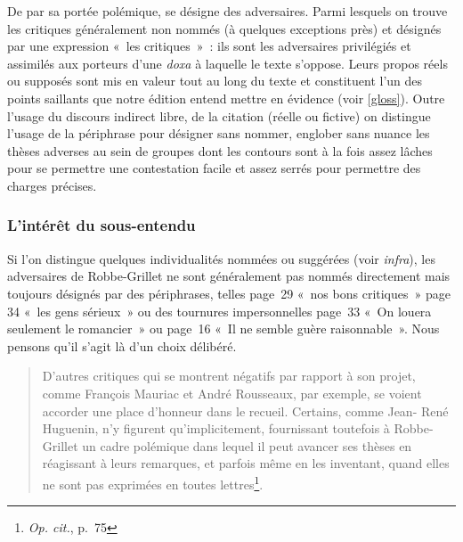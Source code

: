 \documentclass[12pt, a4paper]{article}
\begin{document}
De par sa portée polémique, \punr{} se désigne des adversaires. Parmi lesquels on trouve les critiques généralement non nommés (à quelques exceptions près) et désignés par une expression «~les critiques~»~: ils sont les adversaires privilégiés et assimilés aux porteurs d'une \textit{doxa} à laquelle le texte s'oppose. Leurs propos réels ou supposés sont mis en valeur tout au long du texte et constituent l'un des points saillants que notre édition entend mettre en évidence (voir \ref{gloss}). Outre l'usage du discours indirect libre, de la citation (réelle ou fictive) on distingue l'usage de la périphrase pour désigner sans nommer, englober sans nuance les thèses adverses au sein de groupes dont les contours sont à la fois assez lâches pour se permettre une contestation facile et assez serrés pour permettre des charges précises.


\subsubsection{L'intérêt du sous-entendu}
Si l'on distingue quelques individualités nommées ou suggérées (voir \textit{infra}), les adversaires de Robbe-Grillet ne sont généralement pas nommés directement mais toujours désignés par des périphrases, telles page~29 «~nos bons critiques~» page 34 «~les gens sérieux~» ou des tournures impersonnelles page~33 «~On louera seulement le romancier~» ou page~16 «~Il ne semble guère raisonnable~». Nous pensons qu'il s'agit là d'un choix délibéré.

\begin{quote}
    D'autres critiques qui se montrent négatifs par rapport à son projet,
comme François Mauriac et André Rousseaux, par exemple, se voient
accorder une place d’honneur dans le recueil. Certains, comme Jean-
René Huguenin, n’y figurent qu’implicitement, fournissant toutefois à
Robbe-Grillet un cadre polémique dans lequel il peut avancer ses
thèses en réagissant à leurs remarques, et parfois même en les inventant,
quand elles ne sont pas exprimées en toutes lettres\footnote{\textit{Op. cit.}, p.~75}.
\end{quote}
\end{document}
